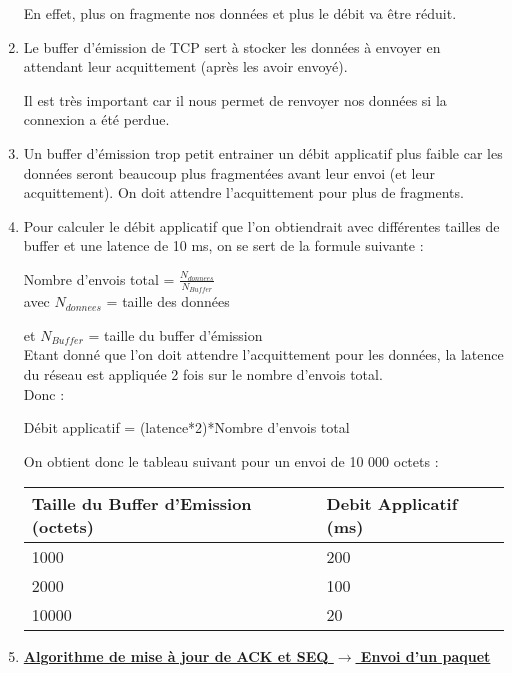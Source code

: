 \documentclass{article}
\begin{document}
\begin{enumerate}[resume]
En effet, plus on fragmente nos données et plus le débit va être réduit.

	\item Le buffer d'émission de TCP sert à stocker les données à envoyer en attendant leur acquittement (après les avoir envoyé).

Il est très important car il nous permet de renvoyer nos données si la connexion a été perdue.

	\item Un buffer d'émission trop petit entrainer un débit applicatif plus faible car les données seront beaucoup plus fragmentées avant leur envoi (et leur acquittement). On doit attendre l'acquittement pour plus de fragments.

	\item Pour calculer le débit applicatif que l'on obtiendrait avec différentes tailles de buffer et une latence de 10 ms, on se sert de la formule suivante :

Nombre d'envois total = $\frac{N_{donnees}}{N_{Buffer}}$\\

avec $N_{donnees}$ = taille des données

et $N_{Buffer}$ = taille du buffer d'émission\\

Etant donné que l'on doit attendre l'acquittement pour les données, la latence du réseau est appliquée 2 fois sur le nombre d'envois total.\\

Donc : 

Débit applicatif = (latence*2)*Nombre d'envois total

On obtient donc le tableau suivant pour un envoi de 10 000 octets :\\

\begin{tabular}{|p{3cm}|p{2cm}|}
\hline
Taille du Buffer d'Emission (octets) & Debit Applicatif (ms)\\
\hline
1000 & 200\\
\hline
2000 & 100\\
\hline
10000 & 20\\
\hline
\end{tabular}

	\item 

\underline{\textbf{Algorithme de mise à jour de ACK et SEQ $\rightarrow$ Envoi d'un paquet}}\\


\end{enumerate}
\end{document}
